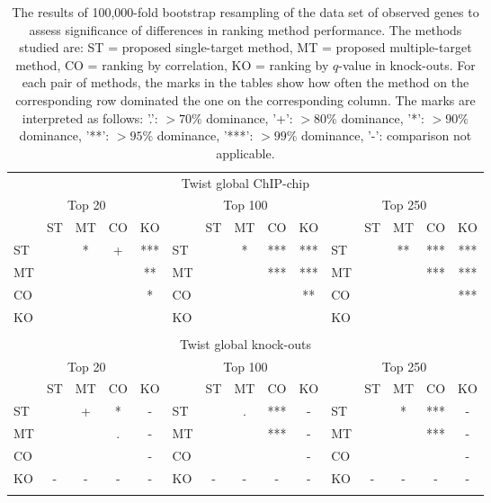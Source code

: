 \documentclass{article}
\begin{document}
\begin{longtable}[c]{lcccc|lcccc|lcccc}
  \caption{The results of 100,000-fold bootstrap resampling of
the data set of observed genes to assess
significance of differences in ranking method performance.  The methods
studied are: ST = proposed single-target method, MT = proposed
multiple-target method, CO = ranking by correlation, KO = ranking by
$q$-value in knock-outs.  For each pair of methods, the marks in the
tables show how often the method on the corresponding row dominated
the one on the corresponding column.  The marks are interpreted as
follows: '.': $> 70 \%$ dominance, '+': $> 80 \%$ dominance,
'*': $> 90 \%$ dominance, '**': $> 95 \%$ dominance, '***': $> 99 \%$
dominance, '-': comparison not applicable.} \\
\multicolumn{15}{c}{Twist global ChIP-chip} \\
\multicolumn{5}{c|}{Top 20} &\multicolumn{5}{c|}{Top 100}  & \multicolumn{5}{c}{Top 250}\\
    & ST  & MT  & CO  & KO &     & ST  & MT  & CO  & KO  &     & ST  & MT  & CO  & KO \\
ST &     & *   & +   & *** & ST &     & *   & *** & *** & ST &     & **  & *** & ***\\
MT &     &     &     & **  & MT &     &     & *** & *** & MT &     &     & *** & ***\\
CO &     &     &     & *   & CO &     &     &     & **  & CO &     &     &     & ***\\
KO &     &     &     &     & KO &     &     &     &     & KO &     &     &     &    \\
\hline
\\[0mm]
\multicolumn{15}{c}{Twist global knock-outs} \\
\multicolumn{5}{c|}{Top 20} &\multicolumn{5}{c|}{Top 100}  & \multicolumn{5}{c}{Top 250}\\
    & ST  & MT  & CO  & KO &     & ST  & MT  & CO  & KO  &     & ST  & MT  & CO  & KO \\
ST &     & +   & *   & -   & ST &     & .   & *** & -   & ST &     & *   & *** & -  \\
MT &     &     & .   & -   & MT &     &     & *** & -   & MT &     &     & *** & -  \\
CO &     &     &     & -   & CO &     &     &     & -   & CO &     &     &     & -  \\
KO & -   & -   & -   & -   & KO & -   & -   & -   & -   & KO & -   & -   & -   & -  \\
\hline
\\[0mm]

\end{longtable}
\end{document}
